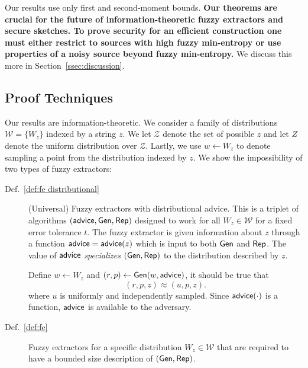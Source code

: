 Our results use only first and second-moment bounds.    \textbf{Our theorems are crucial for the future of information-theoretic fuzzy extractors and secure sketches.  To prove security for an efficient construction one must either restrict to sources with high fuzzy min-entropy or use properties of a noisy source beyond fuzzy min-entropy.}  We discuss this more in Section~\ref{ssec:discussion}.




\subsection{Proof Techniques}
Our results are information-theoretic. We
consider a family of distributions $\mathcal{W} = \{ W_z \}$ indexed by a string $z$.  We let $\mathcal{Z}$ denote the set of possible $z$ and let $Z$
denote the uniform distribution over $\mathcal{Z}$.   
Lastly, we use $w\leftarrow W_z$ to
denote sampling a point from the distribution indexed by $z$.  We show the
impossibility of two types of fuzzy extractors:
\begin{description}
\item[Def.~\ref{def:fe distributional}] (Universal) Fuzzy extractors with distributional advice.  This is a triplet of algorithms $({\mathsf{advice}}, {\mathsf{Gen}}, {\mathsf{Rep}})$ designed to work for all $W_z \in \mathcal{W}$ for a fixed error tolerance $t$.  The fuzzy extractor is given information about $z$ through a function ${\mathsf{advice}} = {\mathsf{advice}}(z)$ which is input to both ${\mathsf{Gen}}$ and ${\mathsf{Rep}}$. The value of ${\mathsf{advice}}$ \emph{specializes} $({\mathsf{Gen}}, {\mathsf{Rep}})$ to the distribution described by $z$. 

Define $w\leftarrow W_z$ and $(r, p) \leftarrow {\ensuremath{\mathsf{Gen}}}(w, {\mathsf{advice}})$, it should be true that 
\[
(r, p, z) \approx (u, p, z).
\] 
where $u$ is uniformly and independently sampled.  Since ${\mathsf{advice}}(\cdot)$ is a function, ${\mathsf{advice}}$ is available to the adversary. 
\item[Def.~\ref{def:fe}] Fuzzy extractors for a specific distribution $W_z \in \mathcal{W}$ that are required to have a bounded size description of $({\mathsf{Gen}}, {\mathsf{Rep}})$.
\end{description}

